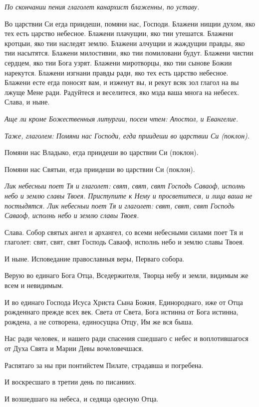 \itshape По скончании пения глаголет канархист блаженны, по уставу.\normalfont{}


Во царствии Си егда приидеши, помяни нас, Господи. Блажени нищии духом, яко тех есть царство небесное. Блажени плачущии, яко тии утешатся. Блажени кротцыи, яко тии наследят землю. Блажени алчущии и жаждущии правды, яко тии насытятся. Блажени милостивии, яко тии помиловани будут. Блажени чистии сердцем, яко тии Бога узрят. Блажени миротворцы, яко тии сынове Божии нарекутся. Блажени изгнани правды ради, яко тех есть царство небесное. Блажени есте егда поносят вам, и изженут вы, и рекут всяк зол глагол на вы лжуще Мене ради. Радуйтеся и веселитеся, яко мзда ваша многа на небесех. Слава, и ныне.


\itshape Аще ли кроме Божественныя литургии, посем чтем:\normalfont{} Апостол, и Евангелие.


\itshape Таже, глаголем:\normalfont{} Помяни нас Господи, егда приидеши во царствии Си (поклон).

Помяни нас Владыко, егда приидеши во царствии Си (поклон).

Помяни нас Святыи, егда приидеши во царствии Си (поклон).


\itshape Лик небесныи поет Тя и глаголет:\normalfont{} свят, свят, свят Господь Саваоф, исполнь небо и землю славы Твоея. Приступите к Нему и просветитеся, и лица ваша не постыдятся. Лик небесныи поет Тя и глаголет: свят, свят, свят Господь Саваоф, исполнь небо и землю славы Твоея. 

Слава. Собор святых ангел и архангел, со всеми небесными силами поет Тя и глаголет: свят, свят, свят Господь Саваоф, исполнь небо и землю славы Твоея. 

И ныне. Исповедание православныя веры, Перваго собора.

Верую во единаго Бога Отца, Вседержителя, Творца небу и земли, видимым же всем и невидимым.

И во единаго Господа Исуса Христа Сына Божия, Единороднаго, иже от Отца рожденнаго прежде всех век. Света от Света, Бога истинна от Бога истинна, рождена, а не сотворена, единосущна Отцу, Им же вся быша.

Нас ради человек, и нашего ради спасения сшедшаго с небес и воплотившагося от Духа Свята и Марии Девы вочеловечшася.

Распятаго за ны при понтийстем Пилате, страдавша и погребена.

И воскресшаго в третии день по писаниих.

И возшедшаго на небеса, и седяща одесную Отца.


